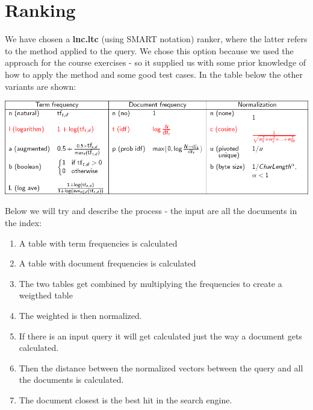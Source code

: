 \chapter{Ranking}
We have chosen a \textbf{lnc.ltc} (using SMART notation) ranker, where the latter refers to the method applied to the query.
We chose this option because we used the approach for the course exercises - so it supplied us with some prior knowledge of how to apply the method and some good test cases.
In the table below the other variants are shown:

\begin{center}
\includegraphics[width=\linewidth]{graphics/rankingmethods}
\end{center}

Below we will try and describe the process - the input are all the documents in the index:
\begin{enumerate}
\item A table with term frequencies is calculated
\item A table with document frequencies is calculated
\item The two tables get combined by multiplying the frequencies to create a weigthed table
\item The weighted is then normalized.
\item If there is an input query it will get calculated just the way a document gets calculated.
\item Then the distance between the normalized vectors between the query and all the documents is calculated.
\item The document closest is the best hit in the search engine.
\end{enumerate}
